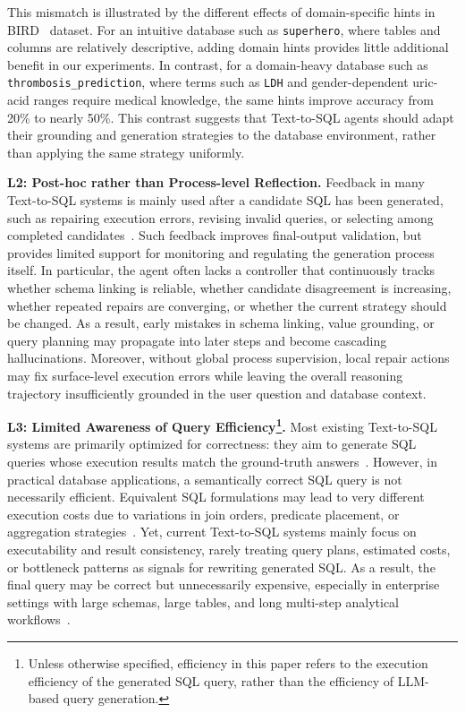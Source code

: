 This mismatch is illustrated by the different effects of domain-specific hints in \textsc{BIRD}~\cite{li2023can} dataset.
For an intuitive database such as \texttt{superhero}, where tables and columns are relatively descriptive, adding domain hints provides little additional benefit in our experiments.
In contrast, for a domain-heavy database such as \texttt{thrombosis\_prediction}, where terms such as \texttt{LDH} and gender-dependent uric-acid ranges require medical knowledge, the same hints improve accuracy from 20\% to nearly 50\%.
This contrast suggests that Text-to-SQL agents should adapt their grounding and generation strategies to the database environment, rather than applying the same strategy uniformly.

\textbf{L2: Post-hoc rather than Process-level Reflection.}
Feedback in many Text-to-SQL systems is mainly used after a candidate SQL has been generated, such as repairing execution errors, revising invalid queries, or selecting among completed candidates~\cite{pourreza2023din,wang2023mac,talaei2024chess,lei2024spider}.
Such feedback improves final-output validation, but provides limited support for monitoring and regulating the generation process itself.
In particular, the agent often lacks a controller that continuously tracks whether schema linking is reliable, whether candidate disagreement is increasing, whether repeated repairs are converging, or whether the current strategy should be changed.
As a result, early mistakes in schema linking, value grounding, or query planning may propagate into later steps and become cascading hallucinations.
Moreover, without global process supervision, local repair actions may fix surface-level execution errors while leaving the overall reasoning trajectory insufficiently grounded in the user question and database context.

\textbf{L3: Limited Awareness of Query Efficiency\footnote{Unless otherwise specified, efficiency in this paper refers to the execution efficiency of the generated SQL query, rather than the efficiency of LLM-based query generation.}.}
Most existing Text-to-SQL systems are primarily optimized for correctness: they aim to generate SQL queries whose execution results match the ground-truth answers~\cite{li2023resdsql,li2024codes,li2023graphix,rai2023improving,scholak2021picard}.
However, in practical database applications, a semantically correct SQL query is not necessarily efficient.
Equivalent SQL formulations may lead to very different execution costs due to variations in join orders, predicate placement, or aggregation strategies~\cite{chaudhuri1998overview,leis2015good,wang2022wetune}.
Yet, current Text-to-SQL systems mainly focus on executability and result consistency, rarely treating query plans, estimated costs, or bottleneck patterns as signals for rewriting generated SQL.
As a result, the final query may be correct but unnecessarily expensive, especially in enterprise settings with large schemas, large tables, and long multi-step analytical workflows~\cite{lin2026cracking,lei2024spider}.


